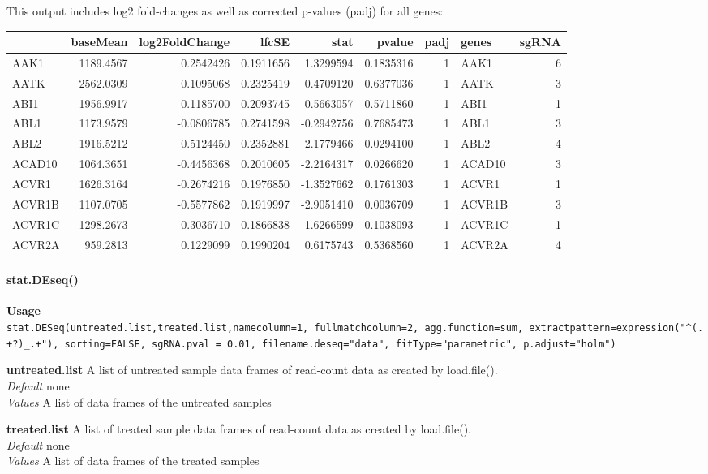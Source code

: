 \documentclass[]{article}
\let\oldparagraph\paragraph
\renewcommand{\paragraph}[1]{\oldparagraph{#1}\mbox{}}
\begin{document}
This output includes log2 fold-changes as well as corrected p-values
(padj) for all genes:

\begin{longtable}[c]{@{}lrrrrrrlr@{}}
\toprule
& baseMean & log2FoldChange & lfcSE & stat & pvalue & padj & genes &
sgRNA\tabularnewline
\midrule
\endhead
AAK1 & 1189.4567 & 0.2542426 & 0.1911656 & 1.3299594 & 0.1835316 & 1 &
AAK1 & 6\tabularnewline
AATK & 2562.0309 & 0.1095068 & 0.2325419 & 0.4709120 & 0.6377036 & 1 &
AATK & 3\tabularnewline
ABI1 & 1956.9917 & 0.1185700 & 0.2093745 & 0.5663057 & 0.5711860 & 1 &
ABI1 & 1\tabularnewline
ABL1 & 1173.9579 & -0.0806785 & 0.2741598 & -0.2942756 & 0.7685473 & 1 &
ABL1 & 3\tabularnewline
ABL2 & 1916.5212 & 0.5124450 & 0.2352881 & 2.1779466 & 0.0294100 & 1 &
ABL2 & 4\tabularnewline
ACAD10 & 1064.3651 & -0.4456368 & 0.2010605 & -2.2164317 & 0.0266620 & 1
& ACAD10 & 3\tabularnewline
ACVR1 & 1626.3164 & -0.2674216 & 0.1976850 & -1.3527662 & 0.1761303 & 1
& ACVR1 & 1\tabularnewline
ACVR1B & 1107.0705 & -0.5577862 & 0.1919997 & -2.9051410 & 0.0036709 & 1
& ACVR1B & 3\tabularnewline
ACVR1C & 1298.2673 & -0.3036710 & 0.1866838 & -1.6266599 & 0.1038093 & 1
& ACVR1C & 1\tabularnewline
ACVR2A & 959.2813 & 0.1229099 & 0.1990204 & 0.6175743 & 0.5368560 & 1 &
ACVR2A & 4\tabularnewline
\bottomrule
\end{longtable}

\paragraph{stat.DEseq()}\label{stat.deseq}

\textbf{Usage}\\
\texttt{stat.DESeq(untreated.list,treated.list,namecolumn=1,\ fullmatchcolumn=2,\ agg.function=sum,\ extractpattern=expression("\^{}(.+?)\_.+"),\ sorting=FALSE,\ sgRNA.pval\ =\ 0.01,\ filename.deseq="data",\ fitType="parametric",\ p.adjust="holm")}

\textbf{untreated.list} A list of untreated sample data frames of
read-count data as created by load.file().\\
\emph{Default} none\\
\emph{Values} A list of data frames of the untreated samples

\textbf{treated.list} A list of treated sample data frames of read-count
data as created by load.file().\\
\emph{Default} none\\
\emph{Values} A list of data frames of the treated samples
\end{document}
